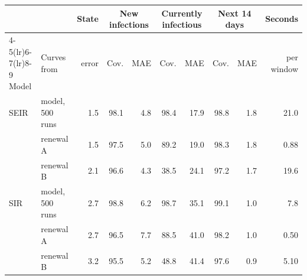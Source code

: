 \begin{tabular}{llrrrrrrrr}
\toprule
 &  & State & \multicolumn{2}{c}{New infections} & \multicolumn{2}{c}{Currently infectious} & \multicolumn{2}{c}{Next 14 days} & Seconds \\
\cmidrule(lr){4-5}\cmidrule(lr){6-7}\cmidrule(lr){8-9}
Model & Curves from & error & Cov. & MAE & Cov. & MAE & Cov. & MAE & per window \\
\midrule
SEIR & model, 500 runs & 1.5 & 98.1 & 4.8 & 98.4 & 17.9 & 98.8 & 1.8 & 21.0 \\
 & renewal A & 1.5 & 97.5 & 5.0 & 89.2 & 19.0 & 98.3 & 1.8 & 0.88 \\
 & renewal B & 2.1 & 96.6 & 4.3 & 38.5 & 24.1 & 97.2 & 1.7 & 19.6 \\
\midrule
SIR & model, 500 runs & 2.7 & 98.8 & 6.2 & 98.7 & 35.1 & 99.1 & 1.0 & 7.8 \\
 & renewal A & 2.7 & 96.5 & 7.7 & 88.5 & 41.0 & 98.2 & 1.0 & 0.50 \\
 & renewal B & 3.2 & 95.5 & 5.2 & 48.8 & 41.4 & 97.6 & 0.9 & 5.10 \\
\bottomrule
\end{tabular}
